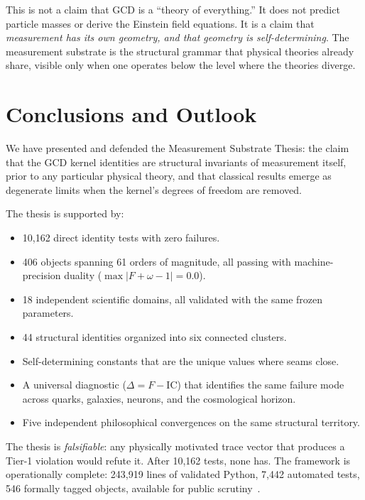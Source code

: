 \documentclass[
  aps,
  prd,
  twocolumn,
  superscriptaddress,
  nofootinbib,
  floatfix
]{revtex4-2}
\newcommand{\IC}{\mathrm{IC}}
\begin{document}
This is not a claim that GCD is a ``theory of everything.''  It does
not predict particle masses or derive the Einstein field equations.
It is a claim that \emph{measurement has its own geometry, and that
geometry is self-determining}.  The measurement substrate is the
structural grammar that physical theories already share, visible only
when one operates below the level where the theories diverge.

\section{Conclusions and Outlook}\label{sec:conclusions}

We have presented and defended the Measurement Substrate Thesis:
the claim that the GCD kernel identities are structural invariants
of measurement itself, prior to any particular physical theory, and
that classical results emerge as degenerate limits when the kernel's
degrees of freedom are removed.

The thesis is supported by:
\begin{itemize}[leftmargin=*]
\item 10{,}162 direct identity tests with zero failures.
\item 406 objects spanning 61 orders of magnitude, all passing with
  machine-precision duality ($\max|F + \omega - 1| = 0.0$).
\item 18 independent scientific domains, all validated with the same
  frozen parameters.
\item 44 structural identities organized into six connected clusters.
\item Self-determining constants that are the unique values where
  seams close.
\item A universal diagnostic ($\Delta = F - \IC$) that identifies
  the same failure mode across quarks, galaxies, neurons, and the
  cosmological horizon.
\item Five independent philosophical convergences on the same
  structural territory.
\end{itemize}

\noindent The thesis is \emph{falsifiable}: any physically motivated
trace vector that produces a Tier-1 violation would refute it.
After 10{,}162 tests, none has.  The framework is operationally
complete: 243{,}919 lines of validated Python, 7{,}442 automated
tests, 546 formally tagged objects, available for public
scrutiny~\cite{umcpmetadatarepo}.
\end{document}
